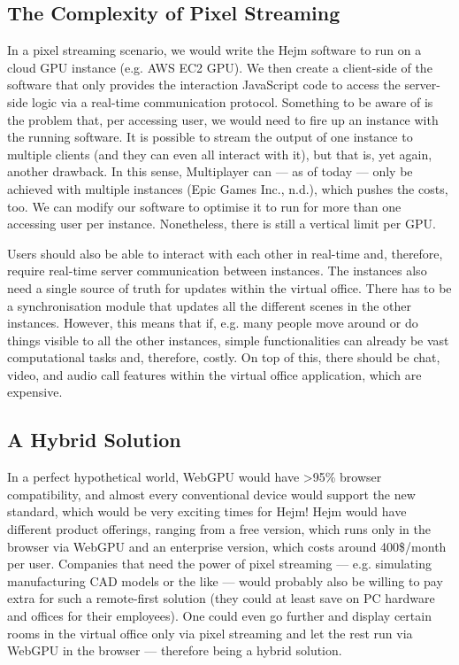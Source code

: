 \documentclass[10pt]{article}
\begin{document}
\begin{sloppypar}
  \subsection{The Complexity of Pixel Streaming}
  \label{subsec:the-complexity-of-pixel-streaming}

  In a pixel streaming scenario, we would write the Hejm software to run on a cloud GPU instance (e.g. AWS EC2 GPU). We then create a client-side of the software that only provides the interaction JavaScript code to access the server-side logic via a real-time communication protocol. Something to be aware of is the problem that, per accessing user, we would need to fire up an instance with the running software. It is possible to stream the output of one instance to multiple clients (and they can even all interact with it), but that is, yet again, another drawback. In this sense, Multiplayer can — as of today — only be achieved with multiple instances (Epic Games Inc., n.d.), which pushes the costs, too. We can modify our software to optimise it to run for more than one accessing user per instance. Nonetheless, there is still a vertical limit per GPU.

  Users should also be able to interact with each other in real-time and, therefore, require real-time server communication between instances. The instances also need a single source of truth for updates within the virtual office. There has to be a synchronisation module that updates all the different scenes in the other instances. However, this means that if, e.g. many people move around or do things visible to all the other instances, simple functionalities can already be vast computational tasks and, therefore, costly. On top of this, there should be chat, video, and audio call features within the virtual office application, which are expensive.

  \subsection{A Hybrid Solution}
  \label{subsec:a-hybrid-solution}

  In a perfect hypothetical world, WebGPU would have >95\% browser compatibility, and almost every conventional device would support the new standard, which would be very exciting times for Hejm! Hejm would have different product offerings, ranging from a free version, which runs only in the browser via WebGPU and an enterprise version, which costs around 400\$/month per user. Companies that need the power of pixel streaming — e.g. simulating manufacturing CAD models or the like — would probably also be willing to pay extra for such a remote-first solution (they could at least save on PC hardware and offices for their employees). One could even go further and display certain rooms in the virtual office only via pixel streaming and let the rest run via WebGPU in the browser — therefore being a hybrid solution.


\end{sloppypar}
\end{document}
